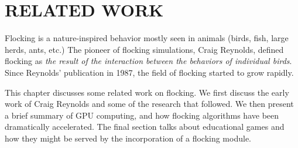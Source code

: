 \chapter{RELATED WORK}\label{chap2}


Flocking is a nature-inspired behavior mostly seen in animals (birds, fish, large herds, ants, etc.) The pioneer of flocking simulations, Craig Reynolds, defined flocking as \textit{the result of the interaction between the behaviors of individual birds}\cite{craig1}. Since Reynolds' publication in 1987, the field of flocking started to grow rapidly. %

This chapter discusses some related work on flocking. We first discuss the early work of Craig Reynolds and some of the research that followed. We then present a brief summary of GPU computing, and how flocking algorithms have been dramatically accelerated. The final section talks about educational games and how they might be served by the incorporation of a flocking module. 





